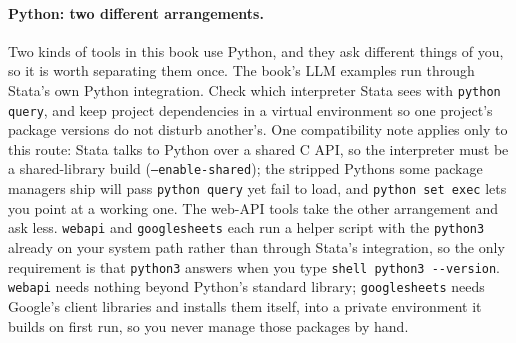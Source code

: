 \documentclass[
    a4paper,
    fontsize=10pt,
    twoside=true,
    numbers=noenddot,
]{kaobook}
\begin{document}
\paragraph{Python: two different arrangements.} Two kinds of tools in this book use Python, and they ask different things of you, so it is worth separating them once. The book's LLM examples run through Stata's own Python integration. Check which interpreter Stata sees with \texttt{python query}, and keep project dependencies in a virtual environment so one project's package versions do not disturb another's. One compatibility note applies only to this route: Stata talks to Python over a shared C API, so the interpreter must be a shared-library build (\texttt{--enable-shared}); the stripped Pythons some package managers ship will pass \texttt{python query} yet fail to load, and \texttt{python set exec} lets you point at a working one. The web-API tools take the other arrangement and ask less. \texttt{webapi} and \texttt{googlesheets} each run a helper script with the \texttt{python3} already on your system path rather than through Stata's integration, so the only requirement is that \texttt{python3} answers when you type \texttt{shell python3 -{}-version}. \texttt{webapi} needs nothing beyond Python's standard library; \texttt{googlesheets} needs Google's client libraries and installs them itself, into a private environment it builds on first run, so you never manage those packages by hand.
\end{document}
